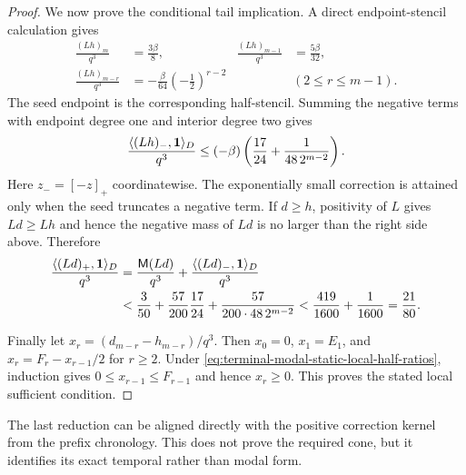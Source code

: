 \begin{proof}
We now prove the conditional tail implication.  A direct endpoint-stencil
calculation gives
\begin{align*}
 \frac{(Lh)_m}{q^3}&=\frac{3\beta}{8},
 &\frac{(Lh)_{m-1}}{q^3}&=\frac{5\beta}{32},\\
 \frac{(Lh)_{m-r}}{q^3}
 &=-\frac{\beta}{64}\left(-\frac12\right)^{r-2}
 &&(2\le r\le m-1).
\end{align*}
The seed endpoint is the corresponding half-stencil.  Summing the negative
terms with endpoint degree one and interior degree two gives
\begin{equation}
 \frac{\langle (Lh)_-,\mathbf{1}\rangle_D}{q^3}
 \le(-\beta)\left(\frac{17}{24}
 +\frac{1}{48\,2^{m-2}}\right).
 \label{eq:terminal-modal-static-tail-negative-mass}
\end{equation}
Here $z_-=[-z]_+$ coordinatewise.
The exponentially small correction is attained only when the seed truncates
a negative term.  If $d\ge h$, positivity of $L$ gives $Ld\ge Lh$ and hence
the negative mass of $Ld$ is no larger than the right side above.  Therefore
\begin{align*}
 \frac{\langle(Ld)_+,\mathbf{1}\rangle_D}{q^3}
 &=\frac{\mathsf M(Ld)}{q^3}
   +\frac{\langle(Ld)_-,\mathbf{1}\rangle_D}{q^3}\\
 &<\frac3{50}+\frac{57}{200}\frac{17}{24}
 +\frac{57}{200\cdot48\,2^{m-2}}
 <\frac{419}{1600}+\frac1{1600}=\frac{21}{80}.
\end{align*}

Finally let $x_r=(d_{m-r}-h_{m-r})/q^3$.  Then $x_0=0$,
$x_1=E_1$, and
$x_r=F_r-x_{r-1}/2$ for $r\ge2$.  Under
\eqref{eq:terminal-modal-static-local-half-ratios}, induction gives
$0\le x_{r-1}\le F_{r-1}$ and hence $x_r\ge0$.  This proves the stated
local sufficient condition.
\end{proof}

The last reduction can be aligned directly with the positive correction
kernel from the prefix chronology.  This does not prove the required cone,
but it identifies its exact temporal rather than modal form.


